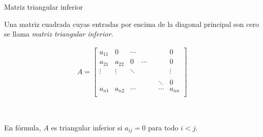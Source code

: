 \documentclass[handout]{beamer} %
\renewcommand{\_}[1]{_{\left[ #1 \right]}}
\renewcommand{\^}[1]{^{\left[ #1 \right]}}
\begin{document}
\begin{frame}{Matriz triangular inferior}
    
    Una matriz cuadrada cuyas entradas por encima de la diagonal principal son cero se llama \textit{matriz triangular inferior}.
    
    
    \begin{align*}
        A=
        \left[
        \begin{array}{ccccccc}
            a_{11} & 0 & \cdots & & &  & 0\\ 
            a_{21} & a_{22} & 0& \cdots & &  & 0\\
            \vdots & \vdots & \ddots & & &  & \vdots\\
            & &  & & &  &\\
            & &  & & & \ddots & 0  \\
            a_{n1} & a_{n2} & \cdots & & & \cdots & a_{nn}\\ 
        \end{array}
        \right]
    \end{align*}
    
    \
    
    En fórmula, $A$ es triangular inferior si $a_{ij}=0$ para todo $i<j$.
\end{frame}
\end{document}
